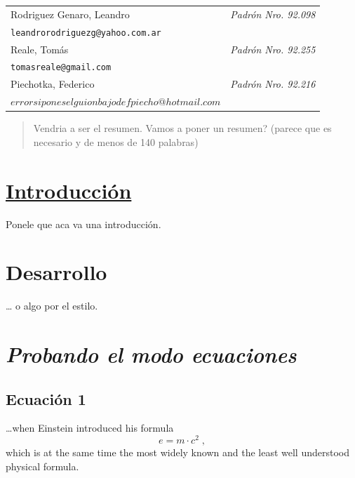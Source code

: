 \begin{flushleft}
{\renewcommand{\arraystretch}{2.5}
\renewcommand{\tabcolsep}{1.2cm}
\begin{tabular}{ l l }
  Rodriguez Genaro, Leandro & \textit{Padrón Nro. 92.098} \\
  \texttt{leandrorodriguezg@yahoo.com.ar} \\
  \hline
  Reale, Tomás & \textit{Padrón Nro. 92.255} \\
  \texttt{tomasreale@gmail.com} \\
  \hline
  Piechotka, Federico & \textit{Padrón Nro. 92.216} \\
  \texttt{$error si pones el guion bajo de f piecho@hotmail.com$} \\
  \hline
\end{tabular}}
\end{flushleft}


\thispagestyle{empty}

\newpage

\begin{abstract}
Vendria a ser el resumen. Vamos a poner un resumen? (parece que es necesario y de menos de 140 palabras)
\end{abstract}

\tableofcontents
\newpage

\section{\underline{Introducción}}
Ponele que aca va una introducción.
\section{Desarrollo}
\ldots{} o algo por el estilo.

\section{\emph{Probando el modo ecuaciones}}

\subsection{Ecuación 1}
\ldots when Einstein introduced his formula
\begin{equation}
e = m \cdot c^2 \; ,
\end{equation}
which is at the same time the most widely known
and the least well understood physical formula.

